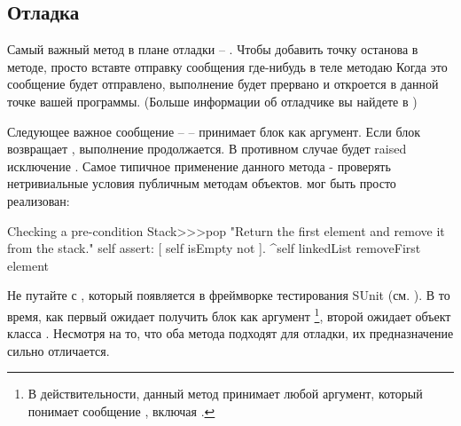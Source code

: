 \documentclass[a4paper,10pt,twoside]{book}
\begin{document}
\subsection{Отладка}

Самый важный метод в плане отладки -- . Чтобы добавить точку останова в методе, просто вставте отправку сообщения  где-нибудь в теле методаю Когда это сообщение будет отправлено, выполнение будет прервано и  откроется в данной точке вашей программы.
(Больше информации об отладчике вы найдете в )


Следующее важное сообщение --  -- принимает блок как аргумент. Если блок возвращает , выполнение продолжается. В противном случае будет raised исключение . Самое типичное применение данного метода - проверять нетривиальные условия публичным методам объектов.  мог быть просто реализован:

\begin{method}{Checking a pre-condition}
Stack>>>pop
    "Return the first element and remove it from the stack."
    self assert: [ self isEmpty not ].
    ^self linkedList removeFirst element
\end{method}

Не путайте  с , который появляется в фреймворке тестирования SUnit (см. ). В то время, как первый ожидает получить блок как аргумент \footnote{В действительности, данный метод принимает любой аргумент, который понимает сообщение , включая .}, второй ожидает объект класса . Несмотря на то, что оба метода подходят для отладки, их предназначение сильно отличается.
\end{document}
